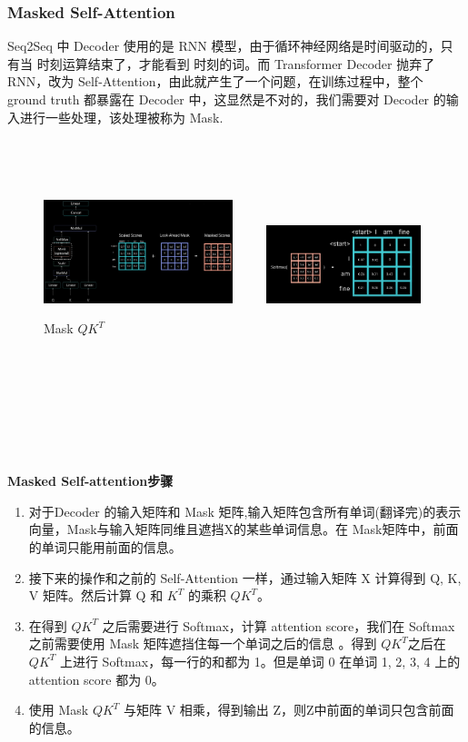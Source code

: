 \documentclass[10pt,t,handout]{beamer}
\begin{document}
\begin{frame}
\frametitle{Masked Self-Attention}
Seq2Seq 中 Decoder 使用的是 RNN 模型，由于循环神经网络是时间驱动的，只有当  时刻运算结束了，才能看到  时刻的词。而 Transformer Decoder 抛弃了 RNN，改为 Self-Attention，由此就产生了一个问题，在训练过程中，整个 ground truth 都暴露在 Decoder 中，这显然是不对的，我们需要对 Decoder 的输入进行一些处理，该处理被称为 Mask.

\

\
\begin{figure}
  	\centering
  	\includegraphics[width=5.5cm]{ 111111.png}	~~~~
  	\includegraphics[width=4.5cm]{0.png}	
 	\caption{Mask $QK^T$}
  
\end{figure}

\end{frame}
\begin{frame}

\

\

{ }

\

\
\begin{block}{\textbf{Masked Self-attention步骤}}
	\begin{enumerate}
		\item<0-> 对于Decoder 的输入矩阵和 Mask 矩阵,输入矩阵包含所有单词(翻译完)的表示向量，Mask与输入矩阵同维且遮挡X的某些单词信息。在 Mask矩阵中，前面的单词只能用前面的信息。
		\
		\
		\item<0-> 接下来的操作和之前的 Self-Attention 一样，通过输入矩阵 X 计算得到 Q, K, V 矩阵。然后计算 Q 和 $K^{T}$ 的乘积 $QK^T$。
		\
		\
		\item<0-> 在得到 $QK^{T}$ 之后需要进行 Softmax，计算 attention score，我们在 Softmax 之前需要使用 Mask 矩阵遮挡住每一个单词之后的信息 。得到  $QK^{T}$之后在  $QK^{T}$ 上进行 Softmax，每一行的和都为 1。但是单词 0 在单词 1, 2, 3, 4 上的 attention score 都为 0。
		\item<0-> 使用 Mask $QK^T$ 与矩阵 V 相乘，得到输出 Z，则Z中前面的单词只包含前面的信息。
	 
	\end{enumerate}
\end{block}
\end{frame}
\end{document}
